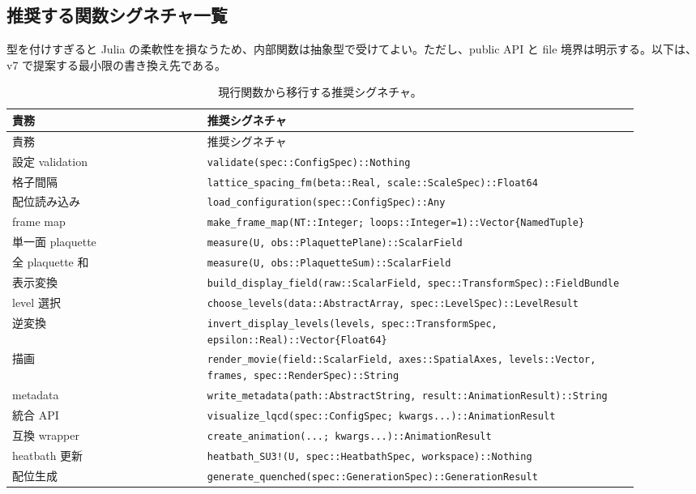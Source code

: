\documentclass[uplatex,dvipdfmx,ja=standard,11pt,a4paper]{bxjsarticle}
\newcommand{\code}[1]{\texttt{#1}}
\begin{document}
\subsection{推奨する関数シグネチャ一覧}
型を付けすぎると Julia の柔軟性を損なうため、内部関数は抽象型で受けてよい。ただし、public API と file 境界は明示する。以下は、v7 で提案する最小限の書き換え先である。

{\small
\begin{longtable}{p{0.28\linewidth}p{0.62\linewidth}}
\caption{現行関数から移行する推奨シグネチャ。}\label{tab:proposed-signatures}\\
\toprule
責務 & 推奨シグネチャ \\
\midrule
\endfirsthead
\toprule
責務 & 推奨シグネチャ \\
\midrule
\endhead
設定 validation & \code{validate(spec::ConfigSpec)::Nothing} \\
格子間隔 & \code{lattice\_spacing\_fm(beta::Real, scale::ScaleSpec)::Float64} \\
配位読み込み & \code{load\_configuration(spec::ConfigSpec)::Any} \\
frame map & \code{make\_frame\_map(NT::Integer; loops::Integer=1)::Vector\{NamedTuple\}} \\
単一面 plaquette & \code{measure(U, obs::PlaquettePlane)::ScalarField} \\
全 plaquette 和 & \code{measure(U, obs::PlaquetteSum)::ScalarField} \\
表示変換 & \code{build\_display\_field(raw::ScalarField, spec::TransformSpec)::FieldBundle} \\
level 選択 & \code{choose\_levels(data::AbstractArray, spec::LevelSpec)::LevelResult} \\
逆変換 & \code{invert\_display\_levels(levels, spec::TransformSpec, epsilon::Real)::Vector\{Float64\}} \\
描画 & \code{render\_movie(field::ScalarField, axes::SpatialAxes, levels::Vector, frames, spec::RenderSpec)::String} \\
metadata & \code{write\_metadata(path::AbstractString, result::AnimationResult)::String} \\
統合 API & \code{visualize\_lqcd(spec::ConfigSpec; kwargs...)::AnimationResult} \\
互換 wrapper & \code{create\_animation(...; kwargs...)::AnimationResult} \\
heatbath 更新 & \code{heatbath\_SU3!(U, spec::HeatbathSpec, workspace)::Nothing} \\
配位生成 & \code{generate\_quenched(spec::GenerationSpec)::GenerationResult} \\
\bottomrule
\end{longtable}
}
\end{document}
